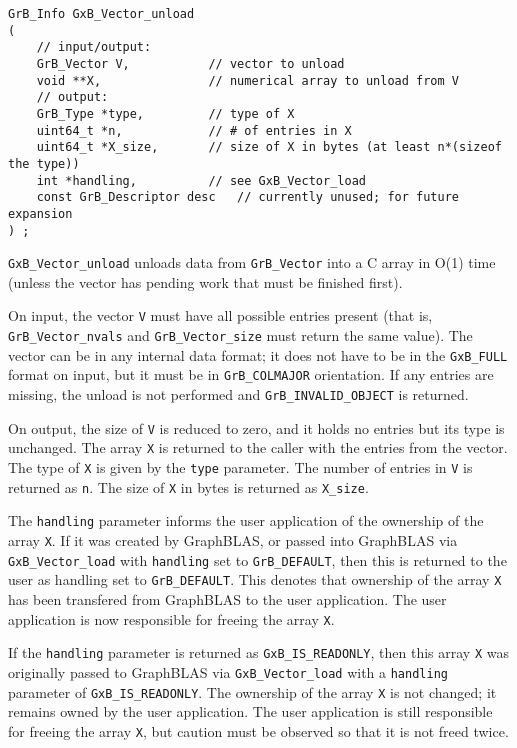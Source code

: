 \begin{mdframed}[userdefinedwidth=6in]
{\footnotesize
\begin{verbatim}
GrB_Info GxB_Vector_unload
(
    // input/output:
    GrB_Vector V,           // vector to unload
    void **X,               // numerical array to unload from V
    // output:
    GrB_Type *type,         // type of X
    uint64_t *n,            // # of entries in X
    uint64_t *X_size,       // size of X in bytes (at least n*(sizeof the type))
    int *handling,          // see GxB_Vector_load
    const GrB_Descriptor desc   // currently unused; for future expansion
) ;
\end{verbatim}
} \end{mdframed}

\verb'GxB_Vector_unload' unloads data from \verb'GrB_Vector' into a C array in
O(1) time (unless the vector has pending work that must be finished first).

On input, the vector \verb'V' must have all possible entries present (that is,
\verb'GrB_Vector_nvals' and \verb'GrB_Vector_size' must return the same value).
The vector can be in any internal data format; it does not have to be in the
\verb'GxB_FULL' format on input, but it must be in \verb'GrB_COLMAJOR'
orientation.  If any entries are missing, the unload is not performed and
\verb'GrB_INVALID_OBJECT' is returned.

On output, the size of \verb'V' is reduced to zero, and it holds no entries but
its type is unchanged.  The array \verb'X' is returned to the caller with the
entries from the vector.  The type of \verb'X' is given by the \verb'type'
parameter.  The number of entries in \verb'V' is returned as \verb'n'.
The size of \verb'X' in bytes is returned as \verb'X_size'.

The \verb'handling' parameter informs the user application of the ownership of
the array \verb'X'.  If it was created by GraphBLAS, or passed into GraphBLAS
via \verb'GxB_Vector_load' with \verb'handling' set to \verb'GrB_DEFAULT', then
this is returned to the user as handling set to \verb'GrB_DEFAULT'.  This
denotes that ownership of the array \verb'X' has been transfered from GraphBLAS
to the user application.  The user application is now responsible for freeing
the array \verb'X'.

If the \verb'handling' parameter is returned as \verb'GxB_IS_READONLY', then
this array \verb'X' was originally passed to GraphBLAS via
\verb'GxB_Vector_load' with a \verb'handling' parameter of
\verb'GxB_IS_READONLY'.  The ownership of the array \verb'X' is not changed; it
remains owned by the user application.  The user application is still
responsible for freeing the array \verb'X', but caution must be observed so
that it is not freed twice.

